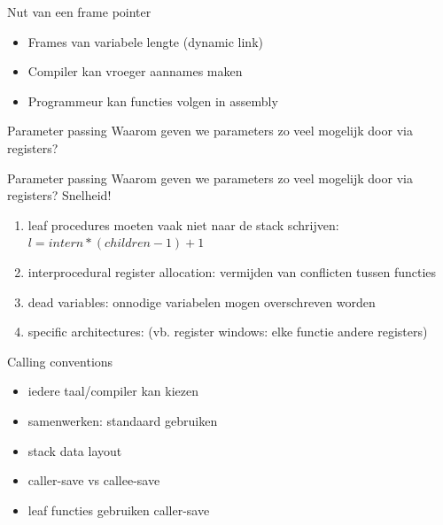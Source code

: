 \documentclass{beamer}
\begin{document}


\begin{frame}{Nut van een frame pointer}
\begin{itemize}
    \item Frames van variabele lengte (dynamic link)
    \item Compiler kan vroeger aannames maken
    \item Programmeur kan functies volgen in assembly
\end{itemize}
\end{frame}

\begin{frame}{Parameter passing}
Waarom geven we parameters zo veel mogelijk door via registers?
\end{frame}

\begin{frame}{Parameter passing}
Waarom geven we parameters zo veel mogelijk door via registers?
Snelheid!
    \begin{enumerate}
        \item leaf procedures moeten vaak niet naar de stack schrijven: $l = intern * (children-1) + 1$
        \item interprocedural register allocation: vermijden van conflicten tussen functies
        \item dead variables: onnodige variabelen mogen overschreven worden
        \item specific architectures: (vb. register windows: elke functie andere registers)
    \end{enumerate}
\end{frame}

\begin{frame}{Calling conventions}
\begin{itemize}
    \item iedere taal/compiler kan kiezen
    \item samenwerken: standaard gebruiken
    \item stack data layout
    \item caller-save vs callee-save
    \item leaf functies gebruiken caller-save
\end{itemize}
\end{frame}
\end{document}
